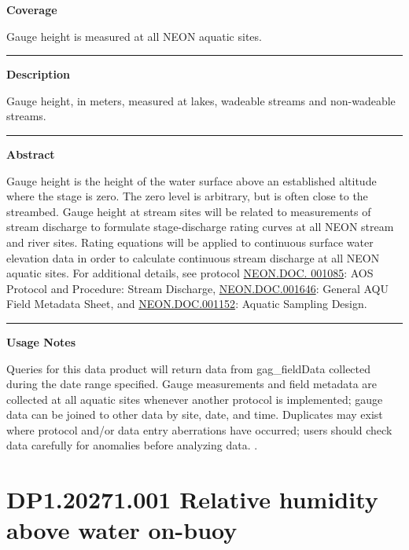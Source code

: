 \documentclass[]{article}
\begin{document}
\textbf{Coverage}

Gauge height is measured at all NEON aquatic sites.

\begin{center}\rule{0.5\linewidth}{\linethickness}\end{center}

\textbf{Description}

Gauge height, in meters, measured at lakes, wadeable streams and
non-wadeable streams.

\begin{center}\rule{0.5\linewidth}{\linethickness}\end{center}

\textbf{Abstract}

Gauge height is the height of the water surface above an established
altitude where the stage is zero. The zero level is arbitrary, but is
often close to the streambed. Gauge height at stream sites will be
related to measurements of stream discharge to formulate stage-discharge
rating curves at all NEON stream and river sites. Rating equations will
be applied to continuous surface water elevation data in order to
calculate continuous stream discharge at all NEON aquatic sites. For
additional details, see protocol
\href{http://data.neonscience.org/api/v0/documents/NEON.DOC.001085vD}{NEON.DOC.
001085}: AOS Protocol and Procedure: Stream Discharge,
\href{http://data.neonscience.org/api/v0/documents/NEON.DOC.001646vC}{NEON.DOC.001646}:
General AQU Field Metadata Sheet, and
\href{http://data.neonscience.org/api/v0/documents/NEON.DOC.001152vA}{NEON.DOC.001152}:
Aquatic Sampling Design.

\begin{center}\rule{0.5\linewidth}{\linethickness}\end{center}

\textbf{Usage Notes}

Queries for this data product will return data from gag\_fieldData
collected during the date range specified. Gauge measurements and field
metadata are collected at all aquatic sites whenever another protocol is
implemented; gauge data can be joined to other data by site, date, and
time. Duplicates may exist where protocol and/or data entry aberrations
have occurred; users should check data carefully for anomalies before
analyzing data. \newpage
.

\section{DP1.20271.001 Relative humidity above water
on-buoy}\label{dp1.20271.001-relative-humidity-above-water-on-buoy}
\end{document}
